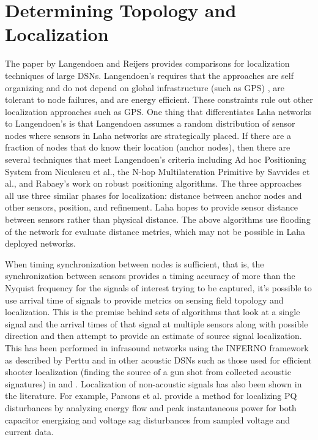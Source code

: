 \section{Determining Topology and Localization}\label{sec:determining-topology-and-localization}
The paper by Langendoen and Reijers\cite{langendoen2003distributed} provides comparisons for localization techniques of large DSNs. Langendoen's requires that the approaches are self organizing and do not depend on global infrastructure (such as GPS) , are tolerant to node failures, and are energy efficient. These constraints rule out other localization approaches such as GPS. One thing that differentiates Laha networks to Langendoen's is that Langendoen assumes a random distribution of sensor nodes where sensors in Laha networks are strategically placed. If there are a fraction of nodes that do know their location (anchor nodes), then there are several techniques that meet Langendoen's criteria including Ad hoc Positioning System from Niculescu et al.\cite{niculescu2003ad}, the N-hop Multilateration Primitive by Savvides et al.\cite{savvides2002bits}, and Rabaey's work on robust positioning algorithms\cite{rabaey2002robust}. The three approaches all use three similar phases for localization: distance between anchor nodes and other sensors, position, and refinement. Laha hopes to provide sensor distance between sensors rather than physical distance. The above algorithms use flooding of the network for evaluate distance metrics, which may not be possible in Laha deployed networks.

When timing synchronization between nodes is sufficient, that is, the synchronization between sensors provides a timing accuracy of more than the Nyquist frequency for the signals of interest trying to be captured, it's possible to use arrival time of signals to provide metrics on sensing field topology and localization. This is the premise behind sets of algorithms that look at a single signal and the arrival times of that signal at multiple sensors along with possible direction and then attempt to provide an estimate of source signal localization. This has been performed in infrasound networks using the INFERNO framework as described by Perttu\cite{perttu2013regional} and in other acoustic DSNs such as those used for efficient shooter localization (finding the source of a gun shot from collected acoustic signatures) in \cite{gezici2005localization} and \cite{maroti2004shooter}. Localization of non-acoustic signals has also been shown in the literature. For example, Parsons et al. provide a method for localizing PQ disturbances by analyzing energy flow and peak instantaneous power for both capacitor energizing  and voltage sag disturbances from sampled voltage and current data\cite{parsons1998direction}.

